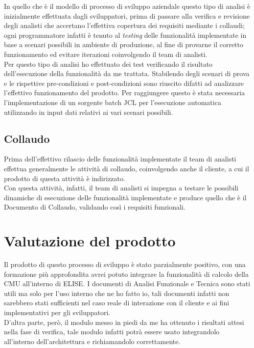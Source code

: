 	In quello che è il modello di processo di sviluppo aziendale questo tipo di analisi è inizialmente effettuata dagli sviluppatori, prima di passare alla verifica e revisione degli analisti che accertano l'effettiva copertura dei requisiti mediante i collaudi; ogni programmatore infatti è tenuto al \textit{testing} delle funzionalità implementate in base a scenari possibili in ambiente di produzione, al fine di provarne il corretto funzionamento ed evitare iterazioni coinvolgendo il team di analisti.\\

	Per questo tipo di analisi ho effettuato dei test verificando il risultato dell'esecuzione della funzionalità da me trattata. Stabilendo degli scenari di prova e le rispettive pre-condizioni e post-condizioni sono riuscito difatti ad analizzare l'effettivo funzionamento del prodotto. Per raggiungere questo è stata necessaria l'implementazione di un sorgente batch JCL per l'esecuzione automatica utilizzando in input dati relativi ai vari scenari possibili.
		
\subsection{Collaudo}

	Prima dell'effettivo rilascio delle funzionalità implementate il team di analisti effettua generalmente le attività di collaudo, coinvolgendo anche il cliente, a cui il prodotto di questa attività è indirizzato.\\
	
	Con questa attività, infatti, il team di analisti si impegna a testare le possibili dinamiche di esecuzione delle funzionalità implementate e produce quello che è il Documento di Collaudo, validando così i requisiti funzionali.\\

\section{Valutazione del prodotto}

	Il prodotto di questo processo di sviluppo è stato parzialmente positivo, con una formazione più approfondita avrei potuto integrare la funzionalità di calcolo della CMU all'interno di ELISE. I documenti di Analisi Funzionale e Tecnica sono stati utili ma solo per l'uso interno che ne ho fatto io, tali documenti infatti non sarebbero stati sufficienti nel caso reale di interazione con il cliente e ai fini implementativi per gli sviluppatori.\\
	
	D'altra parte, però, il modulo messo in piedi da me ha ottenuto i risultati attesi nella fase di verifica, tale modulo infatti potrà essere usato integrandolo all'interno dell'architettura e richiamandolo correttamente.